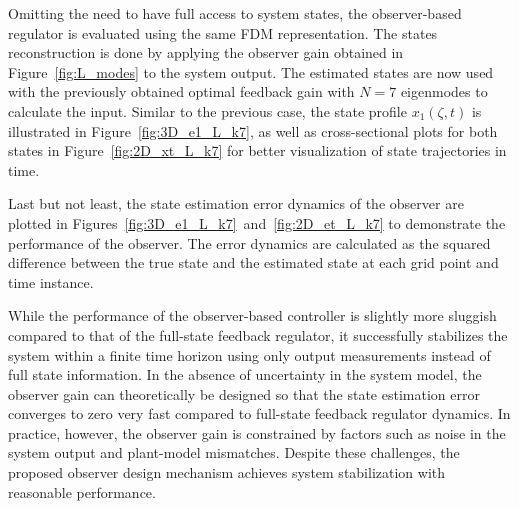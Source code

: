 Omitting the need to have full access to system states, the observer-based regulator is evaluated using the same FDM representation. The states reconstruction is done by applying the observer gain obtained in Figure~\ref{fig:L_modes} to the system output. The estimated states are now used with the previously obtained optimal feedback gain with $N=7$ eigenmodes to calculate the input. Similar to the previous case, the state profile $x_1(\zeta,t)$ is illustrated in Figure~\ref{fig:3D_e1_L_k7}, as well as cross-sectional plots for both states in Figure~\ref{fig:2D_xt_L_k7} for better visualization of state trajectories in time.

Last but not least, the state estimation error dynamics of the observer are plotted in Figures~\ref{fig:3D_e1_L_k7}~and~\ref{fig:2D_et_L_k7} to demonstrate the performance of the observer. The error dynamics are calculated as the squared difference between the true state and the estimated state at each grid point and time instance.

While the performance of the observer-based controller is slightly more sluggish compared to that of the full-state feedback regulator, it successfully stabilizes the system within a finite time horizon using only output measurements instead of full state information. In the absence of uncertainty in the system model, the observer gain can theoretically be designed so that the state estimation error converges to zero very fast compared to full-state feedback regulator dynamics. In practice, however, the observer gain is constrained by factors such as noise in the system output and plant-model mismatches. Despite these challenges, the proposed observer design mechanism achieves system stabilization with reasonable performance.
